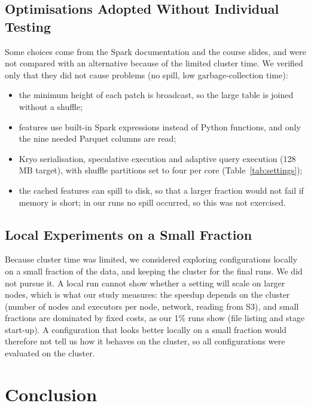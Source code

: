 \documentclass[a4paper, 11pt]{article} %
\begin{document}
\subsection{Optimisations Adopted Without Individual Testing}
Some choices come from the Spark documentation and the course slides, and were not compared with an alternative because of the limited cluster time. We verified only that they did not cause problems (no spill, low garbage-collection time):
\begin{itemize}
\item the minimum height of each patch is broadcast, so the large table is joined without a shuffle;
\item features use built-in Spark expressions instead of Python functions, and only the nine needed Parquet columns are read;
\item Kryo serialisation, speculative execution and adaptive query execution (128 MB target), with shuffle partitions set to four per core (Table~\ref{tab:settings});
\item the cached features can spill to disk, so that a larger fraction would not fail if memory is short; in our runs no spill occurred, so this was not exercised.
\end{itemize}

\subsection{Local Experiments on a Small Fraction}
Because cluster time was limited, we considered exploring configurations locally on a small fraction of the data, and keeping the cluster for the final runs. We did not pursue it. A local run cannot show whether a setting will scale on larger nodes, which is what our study measures: the speedup depends on the cluster (number of nodes and executors per node, network, reading from S3), and small fractions are dominated by fixed costs, as our 1\% runs show (file listing and stage start-up). A configuration that looks better locally on a small fraction would therefore not tell us how it behaves on the cluster, so all configurations were evaluated on the cluster.

\section{Conclusion}
\end{document}
